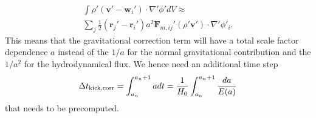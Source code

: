 \begin{multline}
\int{} \rho{}'\left(\mathbf{v}' -
\mathbf{w}_i' \right)\cdot{}
\nabla{}'\phi{}' dV \approx{} \\\sum_j \frac{1}{2}
\left(\mathbf{r}_j' - \mathbf{r}_i'\right)
a^2 \mathbf{F}_{m,ij}'\left(\rho{}'\mathbf{v}'\right) \cdot{}
\nabla{}'\phi{}'_i.
\end{multline}
This means that the gravitational correction term will have a total scale factor
dependence $a$ instead of the $1/a$ for the normal gravitational contribution
and the $1/a^2$ for the hydrodynamical flux. We hence need an additional time
step
\begin{equation}
\Delta{}t_{\rm{}kick,corr} = \int_{a_n}^{a_n+1} adt = \frac{1}{H_0}
\int_{a_n}^{a_n+1} \frac{da}{E(a)}
\end{equation}
that needs to be precomputed.
